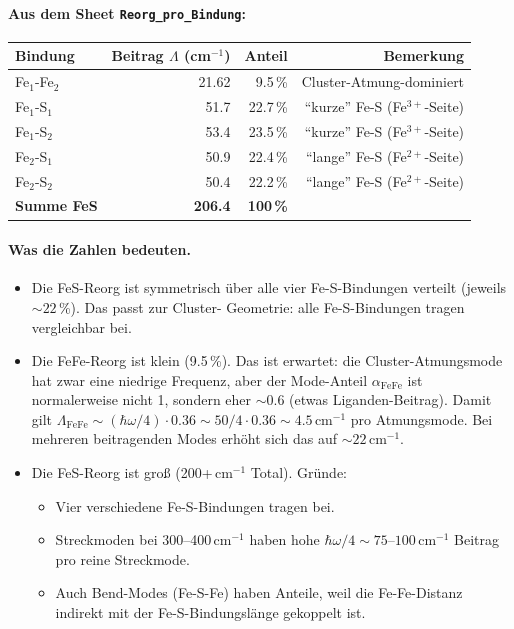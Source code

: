 \documentclass[11pt,a4paper,twoside]{article}
\theoremstyle{remark}
\begin{document}
\paragraph{Aus dem Sheet \texttt{Reorg\_pro\_Bindung}:}
\begin{center}
\begin{tabular}{lrrr}
  \toprule
  \textbf{Bindung} & \textbf{Beitrag $\Lambda$ (cm$^{-1}$)} & \textbf{Anteil} & \textbf{Bemerkung} \\
  \midrule
  Fe$_1$-Fe$_2$       &  21.62 & 9.5\,\%  & Cluster-Atmung-dominiert \\
  Fe$_1$-S$_1$       &  51.7 & 22.7\,\% & "`kurze"' Fe-S (Fe$^{3+}$-Seite) \\
  Fe$_1$-S$_2$       &  53.4 & 23.5\,\% & "`kurze"' Fe-S (Fe$^{3+}$-Seite) \\
  Fe$_2$-S$_1$       &  50.9 & 22.4\,\% & "`lange"' Fe-S (Fe$^{2+}$-Seite) \\
  Fe$_2$-S$_2$       &  50.4 & 22.2\,\% & "`lange"' Fe-S (Fe$^{2+}$-Seite) \\
  \midrule
  \textbf{Summe FeS}  & \textbf{206.4} & \textbf{100\,\%} & \\
  \bottomrule
\end{tabular}
\end{center}

\paragraph{Was die Zahlen bedeuten.}
\begin{itemize}\setlength{\itemsep}{0pt}
  \item Die FeS-Reorg ist symmetrisch \"uber alle vier Fe-S-Bindungen
        verteilt (jeweils $\sim 22$\,\%). Das passt zur Cluster-
        Geometrie: alle Fe-S-Bindungen tragen vergleichbar bei.
  \item Die FeFe-Reorg ist klein (9.5\,\%). Das ist erwartet: die
        Cluster-Atmungsmode hat zwar eine niedrige Frequenz, aber
        der Mode-Anteil $\alpha_\text{FeFe}$ ist normalerweise
        nicht 1, sondern eher $\sim 0.6$ (etwas Liganden-Beitrag).
        Damit gilt $\Lambda_\text{FeFe} \sim
        (\hbar\omega/4)\cdot 0.36 \sim 50/4 \cdot 0.36 \sim
        4.5$\,cm$^{-1}$ pro Atmungsmode. Bei mehreren beitragenden
        Modes erh\"oht sich das auf $\sim 22$\,cm$^{-1}$.
  \item Die FeS-Reorg ist gro{\ss} (200+\,cm$^{-1}$ Total). Gr\"unde:
        \begin{itemize}
          \item Vier verschiedene Fe-S-Bindungen tragen bei.
          \item Streckmoden bei 300--400\,cm$^{-1}$ haben hohe
                $\hbar\omega/4 \sim 75$--$100$\,cm$^{-1}$ Beitrag pro
                reine Streckmode.
          \item Auch Bend-Modes (Fe-S-Fe) haben Anteile, weil die
                Fe-Fe-Distanz indirekt mit der Fe-S-Bindungsl\"ange
                gekoppelt ist.
        \end{itemize}
\end{itemize}
\end{document}
